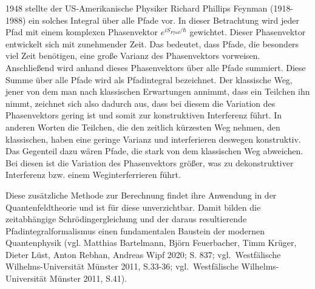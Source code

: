 \documentclass[12pt,oneside, a4paper]{scrbook}
\begin{document}
1948 stellte der US-Amerikanische Physiker Richard Phillips Feynman (1918-1988) ein solches Integral über alle Pfade vor. In dieser Betrachtung wird jeder Pfad mit einem komplexen Phasenvektor $e^{i S_{Pfad}/\hbar}$ gewichtet. Dieser Phasenvektor entwickelt sich mit zunehmender Zeit. Das bedeutet, dass Pfade, die besonders viel Zeit benötigen, eine große Varianz des Phasenvektors vorweisen. Anschließend wird anhand dieses Phasenvektors über alle Pfade summiert. 
Diese Summe über alle Pfade wird als Pfadintegral bezeichnet. Der klassische Weg, jener von dem man nach klassischen Erwartungen annimmt, dass ein Teilchen ihn nimmt, zeichnet sich also dadurch aus, dass bei diesem die Variation des Phasenvektors gering ist und somit zur konstruktiven Interferenz führt. In anderen Worten die Teilchen, die den zeitlich kürzesten Weg nehmen, den klassischen, haben eine geringe Varianz und interferieren deswegen konstruktiv.
Das Gegenteil dazu wären Pfade, die stark von dem klassischen Weg abweichen. Bei diesen ist die Variation des Phasenvektors größer, was zu dekonstruktiver Interferenz bzw. einem Weginterferrieren führt.

Diese zusätzliche Methode zur Berechnung findet ihre Anwendung in der Quantenfeldtheorie und ist für diese unverzichtbar.
Damit bilden die zeitabhängige Schrödingergleichung und der daraus resultierende Pfadintegralformalismus einen fundamentalen Baustein der modernen Quantenphysik (vgl. Matthias Bartelmann, Björn Feuerbacher, Timm Krüger, Dieter Lüst, Anton Rebhan, Andreas Wipf 2020; S. 837; vgl. Westfälische Wilhelms-Universität Münster 2011, S.33-36; vgl. Westfälische Wilhelms-Universität Münster 2011, S.41).
\end{document}
